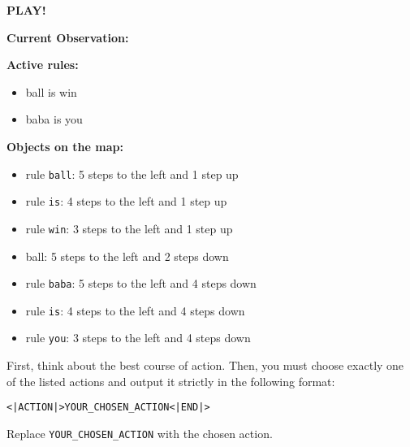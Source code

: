 \begin{GreenBox}
\textbf{PLAY!}

\textbf{Current Observation:}

\textbf{Active rules:}
\begin{itemize}
    \item ball is win
    \item baba is you
\end{itemize}

\textbf{Objects on the map:}
\begin{itemize}
    \item rule \texttt{ball}: 5 steps to the left and 1 step up
    \item rule \texttt{is}: 4 steps to the left and 1 step up
    \item rule \texttt{win}: 3 steps to the left and 1 step up
    \item ball: 5 steps to the left and 2 steps down
    \item rule \texttt{baba}: 5 steps to the left and 4 steps down
    \item rule \texttt{is}: 4 steps to the left and 4 steps down
    \item rule \texttt{you}: 3 steps to the left and 4 steps down
\end{itemize}

First, think about the best course of action.  
Then, you must choose exactly one of the listed actions and output it strictly in the following format:

\texttt{<|ACTION|>YOUR\_CHOSEN\_ACTION<|END|>}

Replace \texttt{YOUR\_CHOSEN\_ACTION} with the chosen action.
\end{GreenBox}

